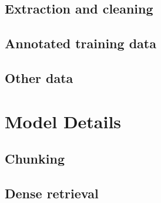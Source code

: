 \documentclass[11pt]{article}
\begin{document}
\subsection{Extraction and cleaning}

\subsection{Annotated training data}

\subsection{Other data}

\section{Model Details}
\label{sec:model}

\subsection{Chunking}

\subsection{Dense retrieval}
\end{document}
